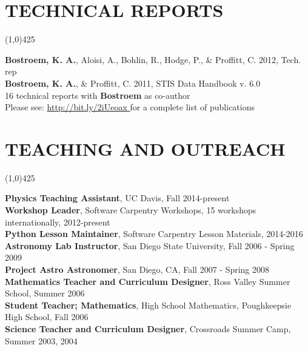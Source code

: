 \documentclass{res}
\begin{document}
\begin{resume}
\section{TECHNICAL REPORTS}
\vspace{-.2in} 
\begin{center}
\line(1,0){425}
\end{center}
\vspace{-.25in} 
\vspace{0.1in}
{\bf Bostroem, K. A.}, Aloisi, A., Bohlin, R., Hodge, P., \& Proffitt, C. 2012, Tech. rep \\
{\bf Bostroem, K. A.}, \& Proffitt, C. 2011, STIS Data Handbook v. 6.0\\
16 technical reports with {\bf Bostroem} as co-author \\
Please see: \color{blue}\url{http://bit.ly/2iUeoax }\color{black}\hspace*{0pt} for a complete list of publications \\

\section{TEACHING AND OUTREACH}
\vspace{-.2in} 
\begin{center}
\line(1,0){425}
\end{center}
\vspace{-.24in} 
\vspace{0.1in}
   {\bf Physics Teaching Assistant}, UC Davis, Fall 2014-present \\
   {\bf  Workshop Leader}, Software Carpentry Workshops, 15 workshops internationally, 2012-present \\	
   {\bf Python Lesson Maintainer}, Software Carpentry Lesson Materials, 2014-2016\\
   {\bf  Astronomy Lab Instructor}, San Diego State University, Fall 2006 - Spring 2009  \\
   {\bf Project Astro Astronomer}, San Diego, CA, Fall 2007 - Spring 2008 \\
   {\bf Mathematics Teacher and Curriculum Designer}, Ross Valley Summer School, Summer 2006 \\
   {\bf Student Teacher; Mathematics}, High School Mathematics, Poughkeepsie High School,  Fall 2006 \\
   {\bf Science Teacher and Curriculum Designer}, Crossroads Summer Camp, Summer 2003, 2004 \\


\end{resume}
\end{document}
